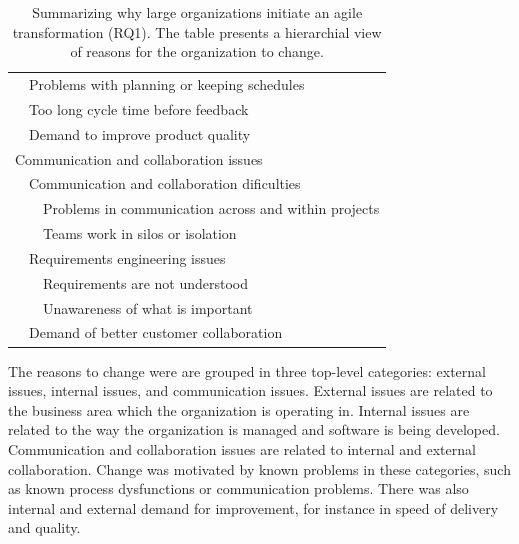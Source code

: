 \documentclass[preprint,authoryear,12pt]{elsarticle}
\begin{document}
\begin{table}
\begin{tabular}{ p{1.2cm} p{1.2cm} l }
        &  \multicolumn{2}{l}{Problems with planning or keeping schedules}  \\

        &  \multicolumn{2}{l}{Too long cycle time before feedback}  \\
        
        &  \multicolumn{2}{l}{Demand to improve product quality}  \\
        
        
        \multicolumn{3}{l}{\rule{0pt}{4ex} Communication and collaboration issues}  \\
        
        &  \multicolumn{2}{l}{Communication and collaboration dificulties}  \\
        &  &  Problems in communication across and within projects  \\
        &  &  Teams work in silos or isolation  \\
        
        &  \multicolumn{2}{l}{Requirements engineering issues}  \\
        &  &  Requirements are not understood  \\
        &  &  Unawareness of what is important  \\
        
        &  \multicolumn{2}{l}{Demand of better customer collaboration}  \\
        
        \bottomrule
    \end{tabular}
    \caption{Summarizing why large organizations initiate an agile transformation (RQ1).
             The table presents a hierarchial view of reasons for the organization to change.}
    \label{table:reasonstochange}
\end{table}

The reasons to change were are grouped in three top-level categories: external
issues, internal issues, and communication issues. External issues are related
to the business area which the organization is operating in. Internal issues are
related to the way the organization is managed and software is being developed.
Communication and collaboration issues are related to internal and external
collaboration. Change was motivated by known problems in these categories, such
as known process dysfunctions or communication problems. There was also internal
and external demand for improvement, for instance in speed of delivery and
quality.
\end{document}

